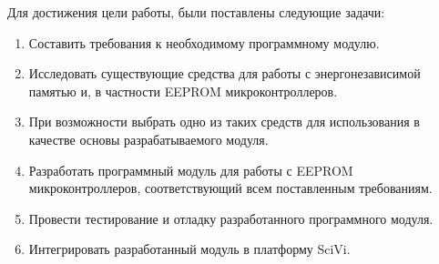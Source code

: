 Для достижения цели работы, были поставлены следующие задачи:
\begin{enumerate}
	\item Составить требования к необходимому программному модулю.
	\item Исследовать существующие средства для работы с энергонезависимой памятью и, в частности EEPROM микроконтроллеров.
	\item При возможности выбрать одно из таких средств для использования в качестве основы разрабатываемого модуля.
	\item Разработать программный модуль для работы с EEPROM микроконтроллеров, соответствующий всем поставленным требованиям.
	\item Провести тестирование и отладку разработанного программного модуля.
	\item Интегрировать разработанный модуль в платформу SciVi.
\end{enumerate}
